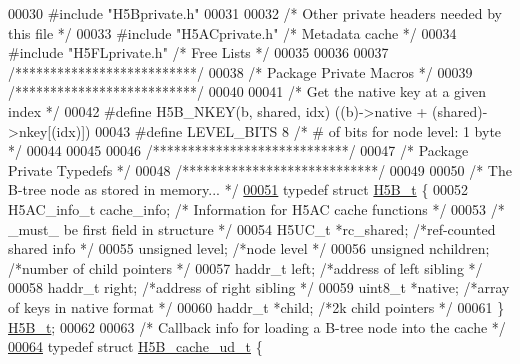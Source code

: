 \begin{DoxyCode}
00030 \textcolor{preprocessor}{#include "H5Bprivate.h"}
00031 
00032 \textcolor{comment}{/* Other private headers needed by this file */}
00033 \textcolor{preprocessor}{#include "H5ACprivate.h"}    \textcolor{comment}{/* Metadata cache           */}
00034 \textcolor{preprocessor}{#include "H5FLprivate.h"}        \textcolor{comment}{/* Free Lists                           */}
00035 
00036 
00037 \textcolor{comment}{/**************************/}
00038 \textcolor{comment}{/* Package Private Macros */}
00039 \textcolor{comment}{/**************************/}
00040 
00041 \textcolor{comment}{/* Get the native key at a given index */}
00042 \textcolor{preprocessor}{#define H5B\_NKEY(b, shared, idx)  ((b)->native + (shared)->nkey[(idx)])}
00043 \textcolor{preprocessor}{#define LEVEL\_BITS  8   }\textcolor{comment}{/* # of bits for node level: 1 byte */}\textcolor{preprocessor}{}
00044 
00045 
00046 \textcolor{comment}{/****************************/}
00047 \textcolor{comment}{/* Package Private Typedefs */}
00048 \textcolor{comment}{/****************************/}
00049 
00050 \textcolor{comment}{/* The B-tree node as stored in memory...  */}
\hyperlink{struct_h5_b__t}{00051} \textcolor{keyword}{typedef} \textcolor{keyword}{struct }\hyperlink{struct_h5_b__t}{H5B\_t} \{
00052     H5AC\_info\_t        cache\_info;     \textcolor{comment}{/* Information for H5AC cache functions */}
00053                                         \textcolor{comment}{/* \_must\_ be first field in structure */}
00054     H5UC\_t      *rc\_shared; \textcolor{comment}{/*ref-counted shared info        */}
00055     \textcolor{keywordtype}{unsigned}        level;      \textcolor{comment}{/*node level                 */}
00056     \textcolor{keywordtype}{unsigned}        nchildren;  \textcolor{comment}{/*number of child pointers       */}
00057     haddr\_t     left;       \textcolor{comment}{/*address of left sibling        */}
00058     haddr\_t     right;      \textcolor{comment}{/*address of right sibling       */}
00059     uint8\_t     *native;    \textcolor{comment}{/*array of keys in native format     */}
00060     haddr\_t     *child;     \textcolor{comment}{/*2k child pointers          */}
00061 \} \hyperlink{struct_h5_b__t}{H5B\_t};
00062 
00063 \textcolor{comment}{/* Callback info for loading a B-tree node into the cache */}
\hyperlink{struct_h5_b__cache__ud__t}{00064} \textcolor{keyword}{typedef} \textcolor{keyword}{struct }\hyperlink{struct_h5_b__cache__ud__t}{H5B\_cache\_ud\_t} \{

\end{DoxyCode}
